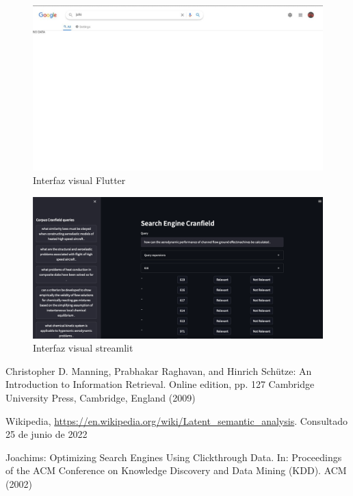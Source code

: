 \documentclass[runningheads]{llncs}
\begin{document}
\begin{figure}
\includegraphics[width=\textwidth]{ui.jpg}
\caption{Interfaz visual Flutter} \label{ui_fig}
\end{figure}
    
\begin{figure}
    \includegraphics[width=\textwidth]{ui_streamlit.png}
    \caption{Interfaz visual streamlit} \label{ui_streamlit_fig}
\end{figure}
        
\begin{thebibliography}{8}




Christopher D. Manning, Prabhakar Raghavan, and Hinrich Schütze:
An Introduction to Information Retrieval. Online edition, pp. 127 Cambridge University Press,
Cambridge, England (2009)

Wikipedia, \url{https://en.wikipedia.org/wiki/Latent\_semantic\_analysis}. Consultado 25 de junio de 2022

Joachims: Optimizing Search Engines Using Clickthrough Data. In: Proceedings of the ACM Conference 
on Knowledge Discovery and Data Mining (KDD). ACM (2002)

\end{thebibliography}
\end{document}

